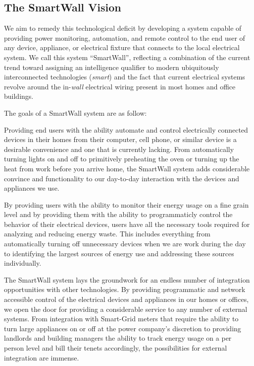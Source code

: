 \documentclass[11pt]{article}
\begin{document}
\subsection{The SmartWall Vision}
We aim to remedy this technological deficit
by developing a system capable of providing
power monitoring, automation, and remote control
to the end user of any device, appliance, or electrical fixture that
connects to the local electrical system. We call this system
``SmartWall'', reflecting a combination of the current trend
toward assigning an intelligence qualifier to modern ubiquitously
interconnected technologies (\emph{smart}) and the fact that
current electrical systems
revolve around the in-\emph{wall} electrical wiring present in most homes and
office buildings.

The goals of a SmartWall system are as follow:
\begin{description}
  \setlength{\itemsep}{0pt}
  \setlength{\parskip}{0pt}
  \setlength{\parsep}{0pt}
\item[Convenience:] Providing end users with the ability automate and
  control electrically connected devices in their homes from their
  computer, cell phone, or similar device is a desirable convenience
  and one that is currently lacking. From automatically turning lights
  on and off to primitively preheating the oven or turning up the heat
  from work before you arrive home, the SmartWall system adds
  considerable convince and functionality to our day-to-day
  interaction with the devices and appliances we use.
\item[Energy Conservation:] By providing users with the ability to
  monitor their energy usage on a fine grain level and by providing them
  with the ability to programmaticly control the behavior of their electrical
  devices, users have all the necessary tools required for analyzing
  and reducing energy waste. This includes everything from
  automatically turning off unnecessary devices when we are work
  during the day to identifying the largest sources of energy use and
  addressing these sources individually.
\item[Integration Framework:] The SmartWall system lays the groundwork for an
  endless number of integration opportunities with other
  technologies. By providing programmatic and network accessible
  control of the electrical devices and appliances in our homes or
  offices, we open the door for providing a considerable service to any
  number of external systems. From integration with Smart-Grid meters
  that require the ability to turn large appliances on or off at the
  power company's discretion to providing landlords and building
  managers the ability to track energy usage on a per person level and
  bill their tenets accordingly, the possibilities for external
  integration are immense.
\end{description}
\end{document}
